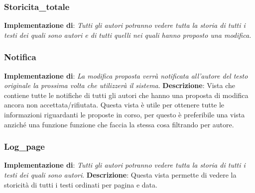 
\subsubsection{Storicita\_totale}
\textbf{Implementazione di}:  \textit{Tutti gli autori potranno vedere tutta la storia di tutti i testi dei quali sono autori e di tutti quelli nei quali hanno proposto una modifica.}
\newline


\subsubsection{Notifica}
\textbf{Implementazione di}: \textit{La modifica proposta verrà notificata all’autore del testo originale la prossima volta che utilizzerà il sistema}.
\newline\newline
\textbf{Descrizione}: Vista che contiene tutte le notifiche di tutti gli autori che hanno una proposta di modifica ancora non accettata/rifiutata. Questa vista è utile per ottenere tutte le informazioni riguardanti le proposte in corso, per questo è preferibile una vista anziché una funzione funzione che faccia la stessa cosa filtrando per autore.


\newpage
\subsubsection{Log\_page}
\textbf{Implementazione di}: \textit{Tutti gli autori potranno vedere tutta la storia di tutti i testi dei quali sono autori}.
\newline\newline
\textbf{Descrizione}: Questa vista permette di vedere la storicità di tutti i testi ordinati per pagina e data.
